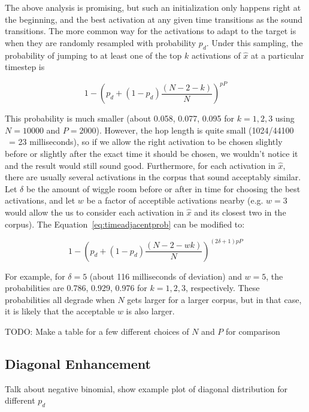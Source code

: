 \documentclass{article}
\begin{document}
The above analysis is promising, but such an initialization only happens right at the beginning, and the best activation at any given time transitions as the sound transitions.  The more common way for the activations to adapt to the target is when they are randomly resampled with probability $p_d$.  Under this sampling, the probability of jumping to at least one of the top $k$ activations of $\hat{x}$ at a particular timestep is 

\begin{equation}
    \label{eq:timeadjacentprob}
    1 - \left( p_d + (1-p_d) \frac{(N-2-k)}{N} \right)^{pP}
\end{equation}

This probability is much smaller (about 0.058, 0.077, 0.095 for $k = 1, 2, 3$ using $N=10000$ and $P=2000$).  However, the hop length is quite small (1024/44100 ~= 23 milliseconds), so if we allow the right activation to be chosen slightly before or slightly after the exact time it should be chosen, we wouldn't notice it and the result would still sound good.  Furthermore, for each activation in $\hat{x}$, there are usually several activations in the corpus that sound acceptably similar.  Let $\delta$ be the amount of wiggle room before or after in time for choosing the best activations, and let $w$ be a factor of acceptible activations nearby (e.g. $w=3$ would allow the us to consider each activation in $\hat{x}$ and its closest two in the corpus).  The Equation~\ref{eq:timeadjacentprob} can be modified to:

\begin{equation}
    \label{eq:timeadjacentprobmodified}
    1 - \left( p_d + (1-p_d) \frac{(N-2-wk)}{N} \right)^{(2 \delta +1)pP}
\end{equation}

For example, for $\delta=5$ (about 116 milliseconds of deviation) and $w = 5$, the probabilities are 0.786, 0.929, 0.976 for $k=1, 2, 3$, respectively.  These probabilities all degrade when $N$ gets larger for a larger corpus, but in that case, it is likely that the acceptable $w$ is also larger.


TODO: Make a table for a few different choices of $N$ and $P$ for comparison


\subsection{Diagonal Enhancement}

Talk about negative binomial, show example plot of diagonal distribution for different $p_d$
\end{document}

